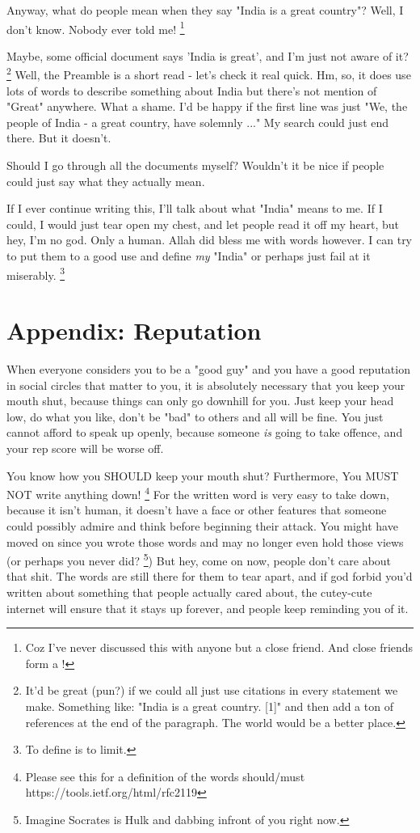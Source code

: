 \documentclass[]{report}
\begin{document}
Anyway, what do people mean when they say "India is a great country"? 
Well, I don't know. Nobody ever told me!
\footnote{
    Coz I've never discussed this with anyone but a close friend.
    And close friends form a !
}

Maybe, some official document says 'India is great', and I'm just not aware of it?
\footnote{
    It'd be great (pun?) if we could all just use citations in every statement we make.
    Something like: "India is a great country. [1]" and then add a ton of references at the end of the paragraph.
    The world would be a better place.    
}
Well, the Preamble is a short read - let's check it real quick. 
Hm, so, it does use lots of words to describe something about India but there's not mention of "Great" anywhere. What a shame. I'd be happy if the first line was just "We, the people of India - a great country, have solemnly ..."
My search could just end there. But it doesn't.

Should I go through all the documents myself? 
Wouldn't it be nice if people could just say what they actually mean. %


If I ever continue writing this, I'll talk about what "India" means to me.
If I could, I would just tear open my chest, and let people read it off my heart, but hey, I'm no god. Only a human. 
Allah did bless me with words however. I can try to put them to a good use and define \textit{my} "India" or perhaps just fail at it miserably. \footnote{To define is to limit.}

\chapter{Appendix: Reputation}

When everyone considers you to be a "good guy" and you have a good reputation in social circles that matter to you, 
it is absolutely necessary that you keep your mouth shut, because things can only go downhill for you. 
Just keep your head low, do what you like, don't be "bad" to others and all will be fine.
You just cannot afford to speak up openly, because someone \textit{is} going to take offence, and your rep score will be worse off.

You know how you SHOULD keep your mouth shut? 
Furthermore, You MUST NOT write anything down!
\footnote{
    Please see this for a definition of the words should/must https://tools.ietf.org/html/rfc2119
}
For the written word is very easy to take down, because it isn't human, it doesn't have a face or other features that someone could possibly admire and think before beginning their attack.
You might have moved on since you wrote those words and may no longer even hold those views (or perhaps you never did? \footnote{Imagine Socrates is Hulk and dabbing infront of you right now.}) 
But hey, come on now, people don't care about that shit. 
The words are still there for them to tear apart, and if god forbid you'd written about something that people actually cared about, the cutey-cute internet will ensure that it stays up forever, and people keep reminding you of it.
\end{document}

